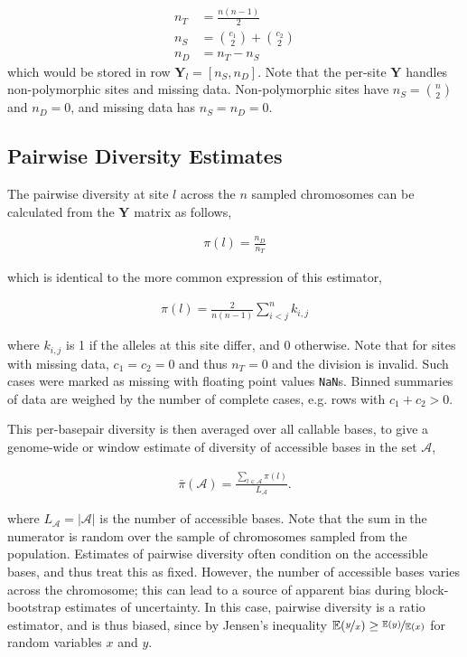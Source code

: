 \documentclass[11pt]{article}
\newcommand{\E}{\mathbb{E}}
\begin{document}
\begin{align*}
  n_T &= \frac{n(n-1)}{2} \\
  n_S &= {c_1 \choose 2} + {c_2 \choose 2} \\
  n_D &= n_T - n_S
\end{align*}
%
which would be stored in row $\mathbf{Y}_l = [n_S, n_D]$. Note that the
per-site $\mathbf{Y}$ handles non-polymorphic sites and missing data.
Non-polymorphic sites have $n_S = {n \choose 2}$ and $n_D = 0$, and missing
data has $n_S = n_D = 0$.

\subsection{Pairwise Diversity Estimates}

The pairwise diversity at site $l$ across the $n$ sampled chromosomes can be
calculated from the $\mathbf{Y}$ matrix as follows,

\begin{align}
  \pi(l) = \frac{n_D}{n_T}
\end{align}

which is identical to the more common expression of this estimator, 

\begin{align}
  \pi(l) = \frac{2}{n(n-1)} \sum_{i < j}^n k_{i,j}
\end{align}

where $k_{i,j}$ is 1 if the alleles at this site differ, and 0 otherwise. Note
that for sites with missing data, $c_1 = c_2 = 0$ and thus $n_T = 0$ and the
division is invalid. Such cases were marked as missing with floating point
values \texttt{NaN}s. Binned summaries of data are weighed by the number of
complete cases, e.g. rows with $c_1 + c_2 > 0$.

This per-basepair diversity is then averaged over all callable bases, to give a
genome-wide or window estimate of diversity of accessible bases in the set
$\mathcal{A}$,

\begin{align*}
  \bar{\pi}(\mathcal{A}) = \frac{\sum_{l \in \mathcal{A}} \pi(l)}{L_\mathcal{A}}.
\end{align*}

where $L_\mathcal{A} = |\mathcal{A}|$ is the number of accessible bases. Note
that the sum in the numerator is random over the sample of chromosomes sampled
from the population. Estimates of pairwise diversity often condition on the
accessible bases, and thus treat this as fixed. However, the number of
accessible bases varies across the chromosome; this can lead to a source of
apparent bias during block-bootstrap estimates of uncertainty.  In this case,
pairwise diversity is a ratio estimator, and is thus biased, since by Jensen's
inequality $\E(\nicefrac{y}{x}) \ge \nicefrac{\E(y)}{\E(x)}$ for random
variables $x$ and $y$.
\end{document}
